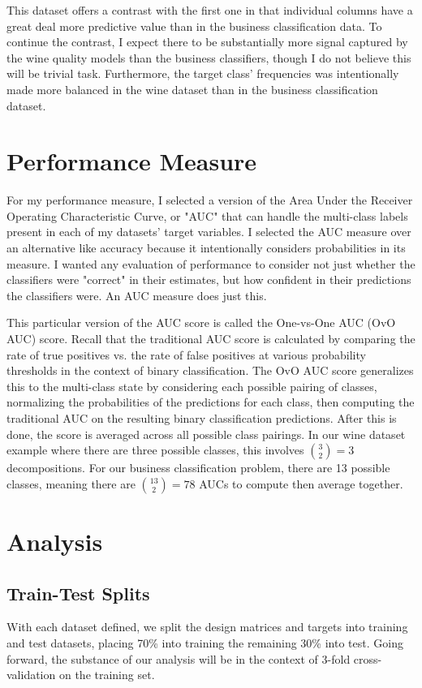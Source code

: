 \documentclass[
	letterpaper, %
]{jdf}
\begin{document}
This dataset offers a contrast with the first one in that individual columns have a great deal more predictive value than in the business classification data. To continue the contrast, I expect there to be substantially more signal captured by the wine quality models than the business classifiers, though I do not believe this will be trivial task. Furthermore, the target class' frequencies was intentionally made more balanced in the wine dataset than in the business classification dataset.

\section{Performance Measure}
For my performance measure, I selected a version of the Area Under the Receiver Operating Characteristic Curve, or "AUC" that can handle the multi-class labels present in each of my datasets' target variables. I selected the AUC measure over an alternative like accuracy because it intentionally considers probabilities in its measure. I wanted any evaluation of performance to consider not just whether the classifiers were "correct" in their estimates, but how confident in their predictions the classifiers were. An AUC measure does just this.

This particular version of the AUC score is called the One-vs-One AUC (OvO AUC) score. Recall that the traditional AUC score is calculated by comparing the rate of true positives vs. the rate of false positives at various probability thresholds in the context of binary classification. The OvO AUC score generalizes this to the multi-class state by considering each possible pairing of classes, normalizing the probabilities of the predictions for each class, then computing the traditional AUC on the resulting binary classification predictions. After this is done, the score is averaged across all possible class pairings. In our wine dataset example where there are three possible classes, this involves ${3 \choose 2} = 3$ decompositions. For our business classification problem, there are 13 possible classes, meaning there are ${13 \choose 2} = 78$ AUCs to compute then average together.

\section{Analysis}

\subsection{Train-Test Splits}
With each dataset defined, we split the design matrices and targets into training and test datasets, placing 70\% into training the remaining 30\% into test. Going forward, the substance of our analysis will be in the context of 3-fold cross-validation on the training set. 
\end{document}
